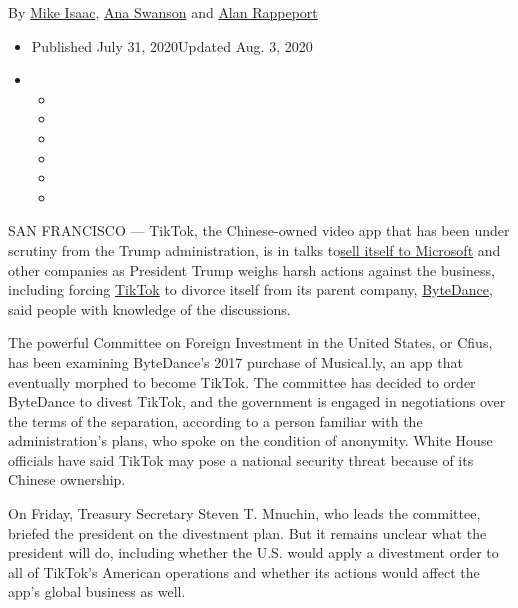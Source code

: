 By \href{https://www.nytimes3xbfgragh.onion/by/mike-isaac}{Mike Isaac},
\href{https://www.nytimes3xbfgragh.onion/by/ana-swanson}{Ana Swanson}
and \href{https://www.nytimes3xbfgragh.onion/by/alan-rappeport}{Alan
Rappeport}

\begin{itemize}
\item
  Published July 31, 2020Updated Aug. 3, 2020
\item
  \begin{itemize}
  \item
  \item
  \item
  \item
  \item
  \item
  \end{itemize}
\end{itemize}

SAN FRANCISCO --- TikTok, the Chinese-owned video app that has been
under scrutiny from the Trump administration, is in talks
to\href{https://www.nytimes3xbfgragh.onion/2020/08/03/technology/tiktok-microsoft-tweens.html}{sell
itself to Microsoft} and other companies as President Trump weighs harsh
actions against the business, including forcing
\href{https://www.nytimes3xbfgragh.onion/2020/08/03/technology/trump-tiktok-microsoft.html}{TikTok}
to divorce itself from its parent company,
\href{https://www.nytimes3xbfgragh.onion/2020/08/03/technology/tiktok-trump-sale-microsoft.html}{ByteDance},
said people with knowledge of the discussions.

The powerful Committee on Foreign Investment in the United States, or
Cfius, has been examining ByteDance's 2017 purchase of Musical.ly, an
app that eventually morphed to become TikTok. The committee has decided
to order ByteDance to divest TikTok, and the government is engaged in
negotiations over the terms of the separation, according to a person
familiar with the administration's plans, who spoke on the condition of
anonymity. White House officials have said TikTok may pose a national
security threat because of its Chinese ownership.

On Friday, Treasury Secretary Steven T. Mnuchin, who leads the
committee, briefed the president on the divestment plan. But it remains
unclear what the president will do, including whether the U.S. would
apply a divestment order to all of TikTok's American operations and
whether its actions would affect the app's global business as well.

